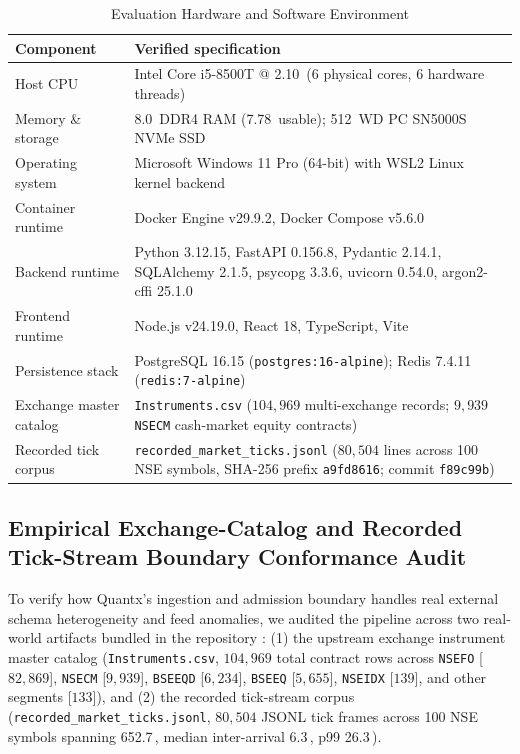\documentclass[journal,onecolumn,10pt]{IEEEtran}
\newcommand{\thinunit}[2]{#1\,\text{#2}}
\begin{document}
\begin{table}[!t]
\caption{Evaluation Hardware and Software Environment}
\label{tab:env}
\centering
\small
\renewcommand{\arraystretch}{1.12}
\begin{tabularx}{\textwidth}{@{}>{\raggedright\arraybackslash}p{1.35in}X@{}}
\toprule
Component & Verified specification \\
\midrule
Host CPU & Intel Core i5-8500T @ \thinunit{2.10}{GHz} (6 physical cores, 6 hardware threads) \\
Memory \& storage & \thinunit{8.0}{GB} DDR4 RAM (\thinunit{7.78}{GB} usable); \thinunit{512}{GB} WD PC SN5000S NVMe SSD \\
Operating system & Microsoft Windows 11 Pro (64-bit) with WSL2 Linux kernel backend \\
Container runtime & Docker Engine v29.9.2, Docker Compose v5.6.0 \\
Backend runtime & Python 3.12.15, FastAPI 0.156.8, Pydantic 2.14.1, SQLAlchemy 2.1.5, psycopg 3.3.6, uvicorn 0.54.0, argon2-cffi 25.1.0 \\
Frontend runtime & Node.js v24.19.0, React 18, TypeScript, Vite \\
Persistence stack & PostgreSQL 16.15 (\texttt{postgres:16-alpine}); Redis 7.4.11 (\texttt{redis:7-alpine}) \\
Exchange master catalog & \texttt{Instruments.csv} ($104{,}969$ multi-exchange records; $9{,}939$ \texttt{NSECM} cash-market equity contracts) \cite{quantx_dataset} \\
Recorded tick corpus & \texttt{recorded\_market\_ticks.jsonl} ($80{,}504$ lines across 100 NSE symbols, SHA-256 prefix \texttt{a9fd8616}; commit \texttt{f89c99b}) \cite{quantx_dataset} \\
\bottomrule
\end{tabularx}
\end{table}

\subsection{Empirical Exchange-Catalog and Recorded Tick-Stream Boundary Conformance Audit}
To verify how Quantx's ingestion and admission boundary handles real external schema heterogeneity and feed anomalies, we audited the pipeline across two real-world artifacts bundled in the repository \cite{quantx_dataset}: (1) the upstream exchange instrument master catalog (\texttt{Instruments.csv}, $104{,}969$ total contract rows across \texttt{NSEFO} [$82{,}869$], \texttt{NSECM} [$9{,}939$], \texttt{BSEEQD} [$6{,}234$], \texttt{BSEEQ} [$5{,}655$], \texttt{NSEIDX} [$139$], and other segments [$133$]), and (2) the recorded tick-stream corpus (\texttt{recorded\_market\_ticks.jsonl}, $80{,}504$ JSONL tick frames across 100 NSE symbols spanning \thinunit{652.7}{s}, median inter-arrival \thinunit{6.3}{ms}, p99 \thinunit{26.3}{ms}).
\end{document}
